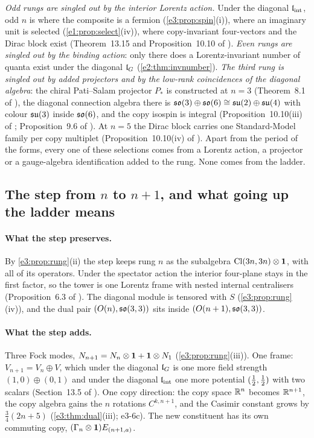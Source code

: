 \emph{Odd rungs are singled out by the interior Lorentz action.} Under the diagonal $\mathfrak l_{\rm int}$, odd $n$ is where the composite is a fermion
(\cref{e3:prop:spin}(i)), where an imaginary unit is selected (\cref{e1:prop:select}(iv)), where copy-invariant four-vectors and the Dirac block
exist (Theorem~13.15 and Proposition~10.10 of \cite{ES17}). \emph{Even rungs
are singled out by the binding action}: only there does a Lorentz-invariant number of quanta exist under the diagonal $\mathfrak l_G$
(\cref{e2:thm:invnumber}). \emph{The third rung is singled out by added projectors and by the low-rank coincidences of the diagonal algebra}: the
chiral Pati--Salam projector $P_*$ is constructed at $n=3$ (Theorem~8.1 of \cite{ES17}), the diagonal connection algebra there is
$\mathfrak{so}(3)\oplus\mathfrak{so}(6)\cong\mathfrak{su}(2)\oplus\mathfrak{su}(4)$ with colour $\mathfrak{su}(3)$ inside $\mathfrak{so}(6)$, and the copy isospin is integral (Proposition~10.10(iii) of \cite{ES17};
Proposition~9.6 of \cite{RE}). At $n=5$ the Dirac block carries one Standard-Model family per copy multiplet (Proposition~10.10(iv) of
\cite{ES17}). Apart from the period of the forms, every one of these selections comes from a Lorentz action, a projector or a gauge-algebra
identification added to the rung. None comes from the ladder.

\subsection{The step from \texorpdfstring{$n$}{n} to \texorpdfstring{$n+1$}{n+1}, and what going up the ladder means}
\label{e3:sec:answer}

\paragraph{What the step preserves.} By \cref{e3:prop:rung}(ii) the step keeps rung $n$ as the subalgebra $\mathrm{Cl}(3n,3n)\otimes\mathbf 1$, with all of its
operators. Under the spectator action the interior four-plane stays in the first factor, so the tower is one Lorentz frame with nested
internal centralisers (Proposition~6.3 of \cite{ES17}). The diagonal module is tensored with $S$ (\cref{e3:prop:rung}(iv)), and the dual pair $(O(n),\mathfrak{so}(3,3))$ sits inside
$(O(n+1),\mathfrak{so}(3,3))$.

\paragraph{What the step adds.} Three Fock modes, $N_{n+1}=N_n\otimes\mathbf 1+\mathbf 1\otimes N_1$ (\cref{e3:prop:rung}(iii)). One frame: $V_{n+1}=V_n\oplus V$, which
under the diagonal $\mathfrak l_G$ is one more field strength $(1,0)\oplus(0,1)$ and under the diagonal $\mathfrak l_{\rm int}$ one more potential $(\tfrac12,\tfrac12)$ with two
scalars (Section~13.5 of \cite{ES17}). One copy direction: the copy space $\mathbb{R}^n$ becomes $\mathbb{R}^{n+1}$, the copy algebra gains the $n$ rotations
$C^{k,n+1}$, and the Casimir constant grows by $\tfrac34(2n+5)$ (\cref{e3:thm:dual}(iii); e3-6c). The new constituent has its own commuting
copy, $(\Gamma_n\otimes\mathbf 1)E_{(n+1,a)}$.

